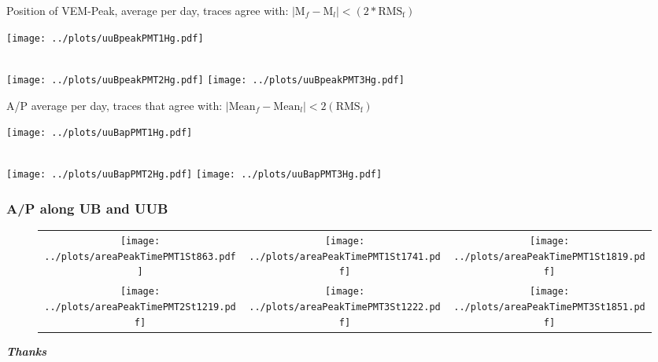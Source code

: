 \documentclass[aspectratio=169]{beamer}
\begin{document}
\begin{frame}
	Position of VEM-Peak, average per day, traces agree with: $\mid \mathrm{M}_f - \mathrm{M}_l \mid < \left( 2*\mathrm{RMS_f} \right) $

  \centering
	\texttt{[image: ../plots/uuBpeakPMT1Hg.pdf]}\quad%
	\begin{minipage}[b][0.4\textheight][c]
		{.45\linewidth}
	\end{minipage}\\[1em]
	\texttt{[image: ../plots/uuBpeakPMT2Hg.pdf]}\quad%
	\texttt{[image: ../plots/uuBpeakPMT3Hg.pdf]}
\end{frame}


\begin{frame}
	A/P average per day, traces that agree with: $\mid \mathrm{Mean}_f - \mathrm{Mean}_l \mid < 2\left( \mathrm{RMS_f} \right) $

  \centering
	\texttt{[image: ../plots/uuBapPMT1Hg.pdf]}%
	\begin{minipage}[b][0.2\textheight][c]
		{.15\linewidth}
	\end{minipage}\\[1em]
	\texttt{[image: ../plots/uuBapPMT2Hg.pdf]}\quad%
	\texttt{[image: ../plots/uuBapPMT3Hg.pdf]}
\end{frame}


\begin{frame}
	\frametitle{A/P along UB and UUB}
	
	\begin{figure}
		\begin{tabularx}{\textwidth}{CCC}
			\texttt{[image: ../plots/areaPeakTimePMT1St863.pdf]}
			&
			\texttt{[image: ../plots/areaPeakTimePMT1St1741.pdf]}
			&
			\texttt{[image: ../plots/areaPeakTimePMT1St1819.pdf]}
			\\ [2ex]
			\texttt{[image: ../plots/areaPeakTimePMT2St1219.pdf]}
			&
			\texttt{[image: ../plots/areaPeakTimePMT3St1222.pdf]}
			&
			\texttt{[image: ../plots/areaPeakTimePMT3St1851.pdf]}
		\end{tabularx}
	\end{figure}
\end{frame}


\begin{frame}
  \centering
	{\Huge\bf\it Thanks}
\end{frame}

\end{document}
